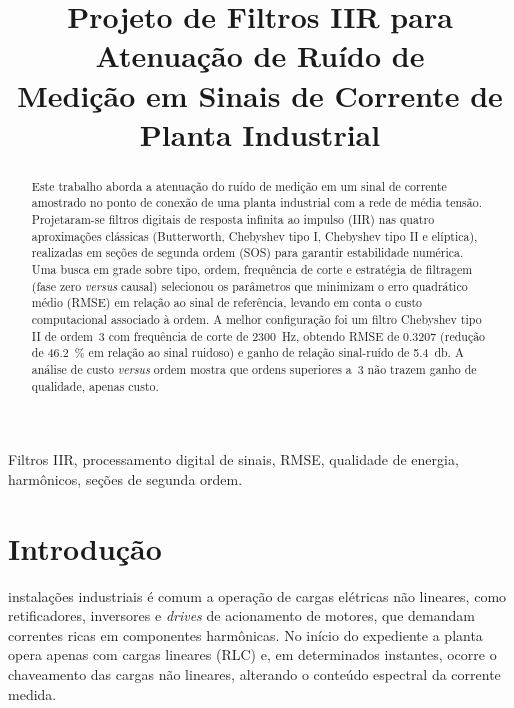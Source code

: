\documentclass[conference]{IEEEtran}
\begin{document}
\title{Projeto de Filtros IIR para Atenuação de Ruído de\\
Medição em Sinais de Corrente de Planta Industrial}

\author{
}

\maketitle

\begin{abstract}
Este trabalho aborda a atenuação do ruído de medição em um sinal de corrente
amostrado no ponto de conexão de uma planta industrial com a rede de média
tensão. Projetaram-se filtros digitais de resposta infinita ao impulso (IIR)
nas quatro aproximações clássicas (Butterworth, Chebyshev tipo I, Chebyshev
tipo II e elíptica), realizadas em seções de segunda ordem (SOS) para garantir
estabilidade numérica. Uma busca em grade sobre tipo, ordem, frequência de corte
e estratégia de filtragem (fase zero \emph{versus} causal) selecionou os
parâmetros que minimizam o erro quadrático médio (RMSE) em relação ao sinal de
referência, levando em conta o custo computacional associado à ordem. A melhor
configuração foi um filtro Chebyshev tipo II de ordem~3 com frequência de corte
de \SI{2300}{\hertz}, obtendo RMSE de \num{0.3207} (redução de
\SI{46.2}{\percent} em relação ao sinal ruidoso) e ganho de relação
sinal-ruído de \SI{5.4}{\decibel}. A análise de custo \emph{versus} ordem
mostra que ordens superiores a~3 não trazem ganho de qualidade, apenas custo.
\end{abstract}

\begin{IEEEkeywords}
Filtros IIR, processamento digital de sinais, RMSE, qualidade de energia,
harmônicos, seções de segunda ordem.
\end{IEEEkeywords}

\section{Introdução}
 instalações industriais é comum a operação de cargas
elétricas não lineares, como retificadores, inversores e \emph{drives} de
acionamento de motores, que demandam correntes ricas em componentes
harmônicas. No início do expediente a planta opera apenas com cargas lineares
(RLC) e, em determinados instantes, ocorre o chaveamento das cargas não
lineares, alterando o conteúdo espectral da corrente medida.
\end{document}
